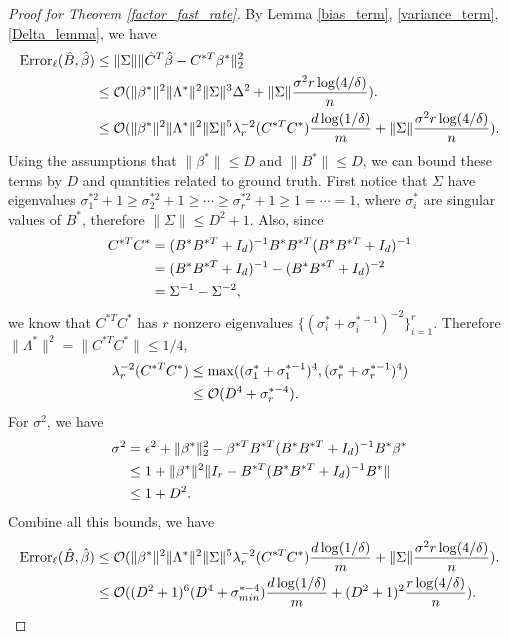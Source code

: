 \begin{proof}[Proof for Theorem \ref{factor_fast_rate}]
By Lemma \ref{bias_term}, \ref{variance_term}, \ref{Delta_lemma}, we have 
\begin{align}
{\rm Error}_{\ell}(\hat B,\hat\beta) &\leq  \|\Sigma\|  \|\hat{C}^{T}\hat{\beta}- C^{* T}\beta^{*}\|_{2}^{2} \notag \\
&\leq \mathcal{O}(\|\beta^{*}\|^{2}\|\Lambda^{*}\|^2\|\Sigma\|^{3} \Delta^{2} + \|\Sigma\|\frac{\sigma^{2}r \log(4/\delta)}{n } ).    \notag \\
&\leq \mathcal{O}(\|\beta^{*}\|^{2}\|\Lambda^{*}\|^2\|\Sigma\|^{5} \lambda_{r}^{-2}(C^{* T}C^{*}) \frac{d \log (1/\delta)}{m} + \|\Sigma\|\frac{\sigma^{2}r \log(4/\delta)}{n } ).    \notag \\
\end{align}
Using the assumptions that $\|\beta^{*}\| \leq D$ and $\|B^{*}\| \leq D$, we can bound these terms by $D$ and quantities related to ground truth. First notice that
$\Sigma$ have eigenvalues $\sigma_{1}^{* 2}+1 \geq \sigma_{2}^{* 2}+1 \geq \cdots \geq \sigma_{r}^{* 2}+1 \geq 1 = \cdots = 1$, where $\sigma_{i}^{*}$ are singular values of $B^{*}$, therefore $\|\Sigma\| \leq D^{2}+1$. Also, since
\begin{align}
C^{* T}C^{*} &= (B^{*}B^{* T} + I_{d})^{-1} B^{*}B^{* T}   (B^{*}B^{* T} + I_{d})^{-1} \notag \\
&= (B^{*}B^{* T} + I_{d})^{-1} - (B^{*}B^{* T} + I_{d})^{-2} \notag \\
&= \Sigma^{-1} - \Sigma^{-2},
\end{align} 
we know that $C^{* T}C^{*}$ has $r$ nonzero eigenvalues $\{(\sigma_{i}^{*}+\sigma_{i}^{* -1})^{-2}\}_{i=1}^{r}$. Therefore $\|\Lambda^{*}\|^2 = \|C^{* T}C^{*}\| \leq 1/4$, 
\begin{align}
\lambda_{r}^{-2}(C^{* T}C^{*}) &\leq \max ((\sigma_{1}^{*}+\sigma_{1}^{* -1})^{4},(\sigma_{r}^{*}+\sigma_{r}^{* -1})^{4}) \notag \\
& \leq \mathcal{O} (D^{4} + \sigma_{r}^{* -4}).
\end{align}
For $\sigma^{2}$, we have
\begin{align}
\sigma^{2}&=\epsilon^{2}+\|\beta^{*}\|_{2}^{2}-\beta^{* T}B^{* T}(B^{*}B^{* T}+I_{d})^{-1}B^{*}\beta^{*} \notag \\
&\leq 1 +\|\beta^{*}\|^{2} \|I_{r}- B^{* T}(B^{*}B^{* T}+I_{d})^{-1}B^{*}\| \notag \\
&\leq 1 +D^{2}.
\end{align}
Combine all this bounds, we have
\begin{align}
{\rm Error}_{\ell}(\hat B,\hat\beta) &\leq \mathcal{O}(\|\beta^{*}\|^{2}\|\Lambda^{*}\|^2\|\Sigma\|^{5} \lambda_{r}^{-2}(C^{* T}C^{*}) \frac{d \log (1/\delta)}{m} + \|\Sigma\|\frac{\sigma^{2}r \log(4/\delta)}{n } ).    \notag \\
&\leq \mathcal{O} ((D^{2}+1)^{6}(D^{4}+\sigma_{min}^{* -4})\frac{d \log (1/\delta)}{m} + (D^{2}+1)^{2}\frac{r \log(4/\delta)}{n }).
\end{align}
\end{proof}

